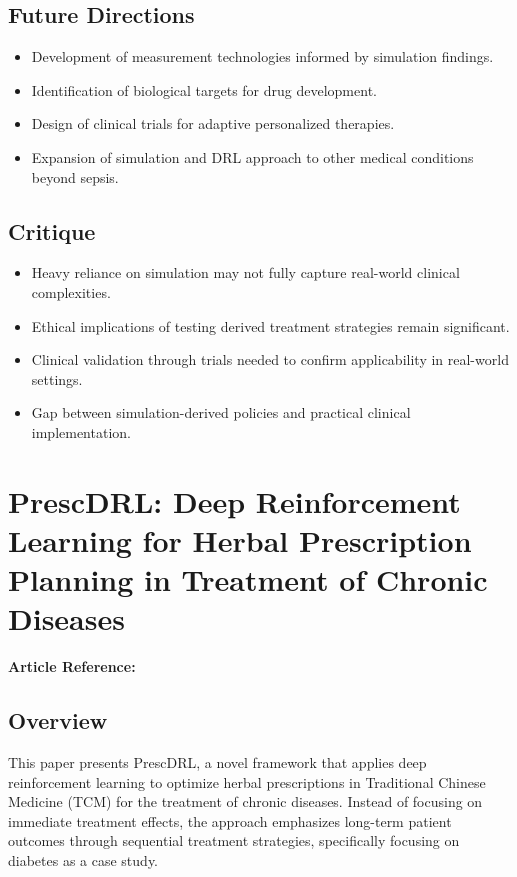 \subsection*{Future Directions}
\begin{itemize}
    \item Development of measurement technologies informed by simulation findings.
    \item Identification of biological targets for drug development.
    \item Design of clinical trials for adaptive personalized therapies.
    \item Expansion of simulation and DRL approach to other medical conditions beyond sepsis.
\end{itemize}

\subsection*{Critique}
\begin{itemize}
    \item Heavy reliance on simulation may not fully capture real-world clinical complexities.
    \item Ethical implications of testing derived treatment strategies remain significant.
    \item Clinical validation through trials needed to confirm applicability in real-world settings.
    \item Gap between simulation-derived policies and practical clinical implementation.
\end{itemize}

\section{PrescDRL: Deep Reinforcement Learning for Herbal Prescription Planning in Treatment of Chronic Diseases}
\textbf{Article Reference:} \cite{article_14}

\subsection*{Overview}
This paper presents PrescDRL, a novel framework that applies deep reinforcement learning to optimize herbal prescriptions in Traditional Chinese Medicine (TCM) for the treatment of chronic diseases. Instead of focusing on immediate treatment effects, the approach emphasizes long-term patient outcomes through sequential treatment strategies, specifically focusing on diabetes as a case study.

